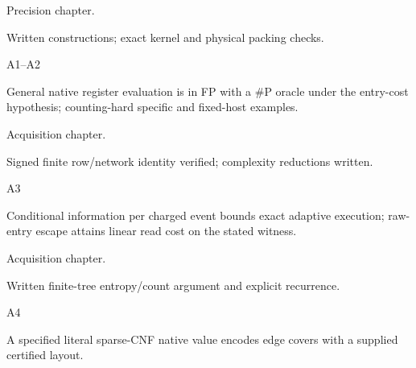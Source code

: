 \documentclass[11pt,a4paper]{article}
\newlength{\OfflineResearchTableWidth}
\newcommand{\OfflineResearchRow}{\par}
\newenvironment{OfflineResearchTable}{%
  \par\medskip\begingroup\small\setlength{\parindent}{0pt}%
  \setlength{\parskip}{3pt plus 1pt minus .5pt}%
  \setlength{\OfflineResearchTableWidth}{\linewidth}%
}{%
  \par\endgroup\medskip%
}
\begin{document}
\begin{OfflineResearchTable}
\begin{minipage}[t]{0.29295\OfflineResearchTableWidth}
Precision chapter.
\end{minipage}\hfill%
\begin{minipage}[t]{0.31185\OfflineResearchTableWidth}\raggedright
Written constructions; exact kernel and physical packing checks.
\end{minipage}%
\OfflineResearchRow
\noindent%
\begin{minipage}[t]{0.06615\OfflineResearchTableWidth}\raggedright
A1--A2
\end{minipage}\hfill%
\begin{minipage}[t]{0.27405\OfflineResearchTableWidth}\raggedright
General native register evaluation is in FP with a \#P oracle
under the entry-cost hypothesis; counting-hard specific and fixed-host
examples.
\end{minipage}\hfill%
\begin{minipage}[t]{0.29295\OfflineResearchTableWidth}\raggedright
Acquisition chapter.
\end{minipage}\hfill%
\begin{minipage}[t]{0.31185\OfflineResearchTableWidth}\raggedright
Signed finite row/network identity
verified; complexity reductions written.
\end{minipage}%
\OfflineResearchRow
\noindent%
\begin{minipage}[t]{0.06615\OfflineResearchTableWidth}\raggedright
A3
\end{minipage}\hfill%
\begin{minipage}[t]{0.27405\OfflineResearchTableWidth}\raggedright
Conditional information per charged event bounds exact adaptive
execution; raw-entry escape attains linear read cost on the stated
witness.
\end{minipage}\hfill%
\begin{minipage}[t]{0.29295\OfflineResearchTableWidth}\raggedright
Acquisition chapter.
\end{minipage}\hfill%
\begin{minipage}[t]{0.31185\OfflineResearchTableWidth}\raggedright
Written finite-tree entropy/count
argument and explicit recurrence.
\end{minipage}%
\OfflineResearchRow
\noindent%
\begin{minipage}[t]{0.06615\OfflineResearchTableWidth}\raggedright
A4
\end{minipage}\hfill%
\begin{minipage}[t]{0.27405\OfflineResearchTableWidth}\raggedright
A specified literal sparse-CNF native value encodes edge covers
with a supplied certified layout.
\end{minipage}\hfill%

\end{OfflineResearchTable}
\end{document}
